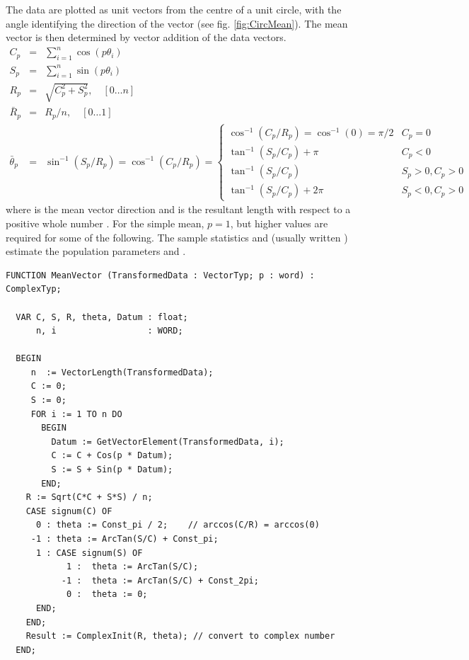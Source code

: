 \begin{refsection}
The data are plotted as unit vectors from the centre of a unit circle, with the angle identifying the direction of the vector (see fig. \ref{fig:CircMean}). The mean vector is then determined by vector addition of the data vectors.
\begin{eqnarray}
 \nonumber %
  C_p &=& \sum_{i = 1}^n{\cos(p \theta_i)} \\
 \nonumber
  S_p &=& \sum_{i = 1}^n{\sin(p \theta_i)} \\
 \nonumber
  R_p &=& \sqrt{C^2_p + S^2_p}, \quad [0\ldots n] \\
 \nonumber
 \bar{R}_p &=& R_p / n, \quad [0\ldots 1] \\
 \nonumber
  \bar{\theta}_p &=& \sin^{-1}(S_p/R_p) = \cos^{-1}(C_p/R_p) = \left\{
     \begin{array}{lr}
        \cos^{-1}(C_p/R_p) = \cos^{-1}(0) = \pi/2 &  C_p = 0          \\
        \tan^{-1}(S_p/C_p) + \pi                  &  C_p < 0          \\
        \tan^{-1}(S_p/C_p)                        &  S_p > 0, C_p > 0 \\
        \tan^{-1}(S_p/C_p) + 2\pi                 &  S_p < 0, C_p > 0
     \end{array}
   \right.
\end{eqnarray}
where  is the mean vector direction and  is the resultant length with respect to a positive whole number . For the simple mean, \( p = 1 \), but higher values are required for some of the following. The sample statistics  and  (usually written ) estimate the population parameters \skalar{\mu} and \skalar{\rho}.

\begin{lstlisting}[caption=Arithmetic mean of circular data]
  FUNCTION MeanVector (TransformedData : VectorTyp; p : word) : ComplexTyp;

  VAR C, S, R, theta, Datum : float;
      n, i                  : WORD;

  BEGIN
     n  := VectorLength(TransformedData);
     C := 0;
     S := 0;
     FOR i := 1 TO n DO
       BEGIN
         Datum := GetVectorElement(TransformedData, i);
         C := C + Cos(p * Datum);
         S := S + Sin(p * Datum);
       END;
    R := Sqrt(C*C + S*S) / n;
    CASE signum(C) OF
      0 : theta := Const_pi / 2;    // arccos(C/R) = arccos(0)
     -1 : theta := ArcTan(S/C) + Const_pi;
      1 : CASE signum(S) OF
            1 :  theta := ArcTan(S/C);
           -1 :  theta := ArcTan(S/C) + Const_2pi;
            0 :  theta := 0;
      END;
    END;
    Result := ComplexInit(R, theta); // convert to complex number
  END;
\end{lstlisting}


\end{refsection}
